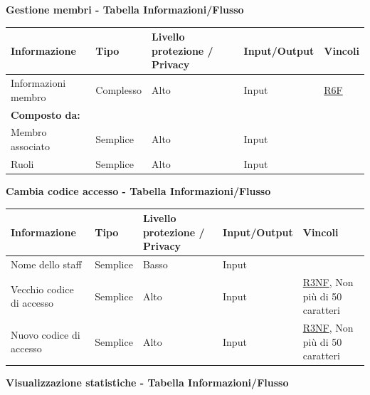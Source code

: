 \documentclass[a4paper]{article}
\begin{document}
\textbf{Gestione membri  - Tabella Informazioni/Flusso}

\begin{center}
    \begin{tabularx}{1\textwidth}{|X|X|X|X|X|}
        \hline
        \textbf{Informazione} &\textbf{Tipo} & \textbf{Livello protezione / Privacy} & \textbf{Input/Output} & \textbf{Vincoli}\\
        \hline
        \hline
        Informazioni membro & Complesso & Alto & Input & \hyperlink{R6F}{R6F}\\
        \textbf{Composto da:} & & & & \\
        Membro associato & Semplice & Alto & Input & \\
        Ruoli & Semplice & Alto & Input & \\
        \hline
    \end{tabularx}
\end{center}


\textbf{Cambia codice accesso  - Tabella Informazioni/Flusso}

\begin{center}
    \begin{tabularx}{1\textwidth}{|X|X|X|X|X|}
        \hline
        \textbf{Informazione} &\textbf{Tipo} & \textbf{Livello protezione / Privacy} & \textbf{Input/Output} & \textbf{Vincoli}\\
        \hline
        \hline
        Nome dello staff & Semplice & Basso & Input & \\
        \hline
        Vecchio codice di accesso & Semplice & Alto & Input & \hyperlink{R3NF}{R3NF}, Non più di 50 caratteri\\
        \hline
        Nuovo codice di accesso & Semplice & Alto & Input & \hyperlink{R3NF}{R3NF}, Non più di 50 caratteri\\
        \hline
    \end{tabularx}
\end{center}

\textbf{Visualizzazione statistiche  - Tabella Informazioni/Flusso}
\end{document}
